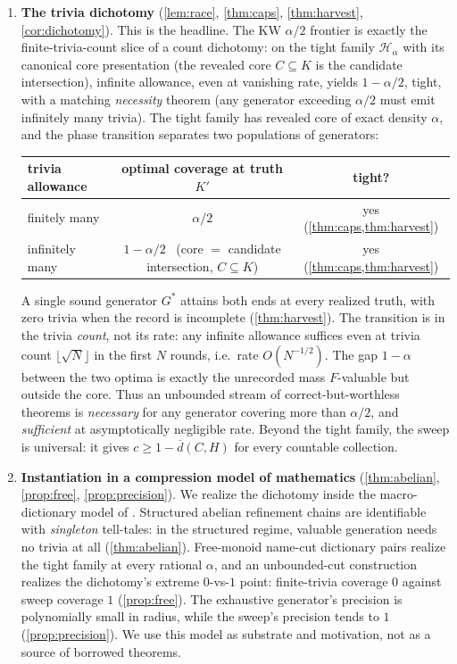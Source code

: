 \documentclass[11pt]{article}
\numberwithin{equation}{section}
\newcommand{\mc}[1]{\mathcal{#1}}
\newcommand{\Amb}{F}
\newcommand{\Val}{H}
\newcommand{\Hcal}{\mc{H}}
\newcommand{\Hfam}{\Hcal_{\alpha}}
\newcommand{\Core}{C}
\newcommand{\dup}[2]{\overline{d}(#1,#2)}
\newcommand{\cov}{c}
\theoremstyle{plain}
\theoremstyle{definition}
\theoremstyle{remark}
\begin{document}
\begin{enumerate}
  \item \textbf{The trivia dichotomy} (\cref{lem:race}, \cref{thm:caps}, \cref{thm:harvest},
    \cref{cor:dichotomy}). This is the headline. The KW $\alpha/2$ frontier is exactly the
    finite-trivia-count slice of a count dichotomy: on the tight family $\Hfam$ with its
    canonical core presentation (the revealed core $\Core\subseteq K$ is the candidate
    intersection), infinite allowance, even at vanishing rate, yields $1-\alpha/2$, tight,
    with a matching \emph{necessity} theorem (any generator exceeding $\alpha/2$ must emit
    infinitely many trivia). The tight family has revealed core of exact density $\alpha$, and
    the phase transition separates two populations of generators:
  \begin{center}
  \begin{tabular}{@{}lcc@{}}
  \toprule
  \textbf{trivia allowance} & \textbf{optimal coverage at truth $K'$} & \textbf{tight?}\\
  \midrule
  finitely many   & $\alpha/2$     & yes (\cref{thm:caps,thm:harvest})\\
  infinitely many & $1-\alpha/2$ \ {\footnotesize(core $=$ candidate intersection, $\Core\subseteq K$)} & yes (\cref{thm:caps,thm:harvest})\\
  \bottomrule
  \end{tabular}
  \end{center}
A single sound generator $G^*$ attains both ends at every realized truth, with zero trivia
when the record is incomplete (\cref{thm:harvest}). The transition is in the trivia
\emph{count}, not its rate: any infinite allowance suffices even at trivia count $\lfloor\sqrt
N\rfloor$ in the first $N$ rounds, i.e.\ rate $O(N^{-1/2})$. The gap $1-\alpha$ between the
two optima is exactly the unrecorded mass $\Amb$-valuable but outside the core. Thus an
unbounded stream of correct-but-worthless theorems is \emph{necessary} for any generator
covering more than $\alpha/2$, and \emph{sufficient} at asymptotically negligible rate. Beyond
the tight family, the sweep is universal: it gives $\cov\ge 1-\dup{\Core}{\Val}$ for every
countable collection.

  \item \textbf{Instantiation in a compression model of mathematics} (\cref{thm:abelian},
    \cref{prop:free}, \cref{prop:precision}). We realize the dichotomy inside the
    macro-dictionary model of \citet{aksenov2026compression}. Structured abelian refinement
    chains are identifiable with \emph{singleton} tell-tales: in the structured regime,
    valuable generation needs no trivia at all (\cref{thm:abelian}). Free-monoid name-cut
    dictionary pairs realize the tight family at every rational $\alpha$, and an unbounded-cut
    construction realizes the dichotomy's extreme $0$-vs-$1$ point: finite-trivia coverage $0$
    against sweep coverage $1$ (\cref{prop:free}). The exhaustive generator's precision is
    polynomially small in radius, while the sweep's precision tends to $1$
    (\cref{prop:precision}). We use this model as substrate and motivation, not as a source of
    borrowed theorems.
\end{enumerate}
\end{document}
